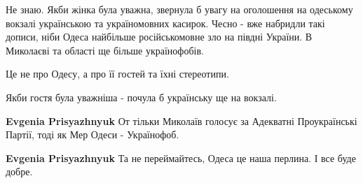 \begin{itemize}
 

Не знаю. Якби жінка була уважна, звернула б увагу на оголошення на одеському
вокзалі українською та україномовних касирок. Чесно - вже набридли такі дописи,
ніби Одеса найбільше російськомовне зло на півдні України. В Миколаєві та
області ще більше українофобів.

\begin{itemize}
 
Це не про Одесу, а про її гостей та їхні стереотипи.

 
Якби гостя була уважніша - почула б українську ще на вокзалі.

 
\textbf{Evgenia Prisyazhnyuk} От тільки Миколаїв голосує за Адекватні Проукраїнські Партії, тоді як Мер Одеси - Українофоб.

 
\textbf{Evgenia Prisyazhnyuk} Та не переймайтесь, Одеса це наша перлина. І все буде добре.
\end{itemize}

 

\end{itemize}
